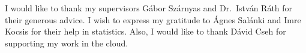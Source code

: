 \chapter*{\koszonetnyilvanitas}

I would like to thank my supervisors Gábor Szárnyas and Dr.~István Ráth for their generous advice. I wish to express my gratitude to Ágnes Salánki and Imre Kocsis for their help in statistics. Also, I would like to thank Dávid Cseh for supporting my work in the cloud.